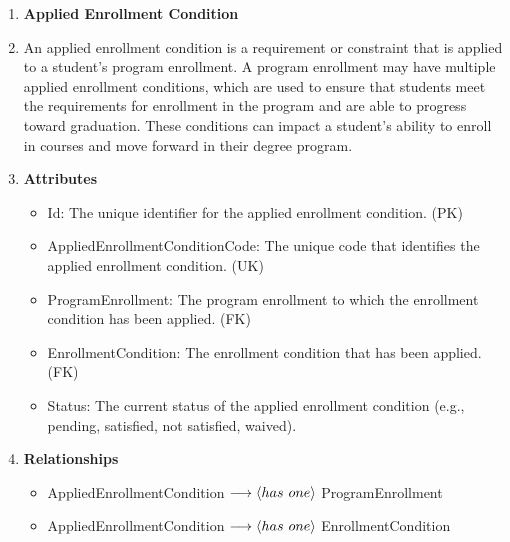 \documentclass[12pt]{article}
\begin{document}
\begin{appendices}
\begin{enumerate}[label=(\roman*)]
    \item \textbf{Applied Enrollment Condition}
    \item[] An applied enrollment condition is a requirement or constraint that is applied to a student's program enrollment. A program enrollment may have multiple applied enrollment conditions, which are used to ensure that students meet the requirements for enrollment in the program and are able to progress toward graduation. These conditions can impact a student's ability to enroll in courses and move forward in their degree program.
    \item[] \textbf{Attributes}
    \begin{itemize}
        \item Id: The unique identifier for the applied enrollment condition. (PK)
        \item AppliedEnrollmentConditionCode: The unique code that identifies the applied enrollment condition. (UK)
        \item ProgramEnrollment: The program enrollment to which the enrollment condition has been applied. (FK)
        \item EnrollmentCondition: The enrollment condition that has been applied. (FK)
        \item Status: The current status of the applied enrollment condition (e.g., pending, satisfied, not satisfied, waived).
    \end{itemize}
    \item[] \textbf{Relationships}
    \begin{itemize}
        \item AppliedEnrollmentCondition $ \longrightarrow \langle has \hspace{0.125cm} one \rangle $ ProgramEnrollment
        \item AppliedEnrollmentCondition $ \longrightarrow \langle has \hspace{0.125cm} one \rangle $ EnrollmentCondition
    \end{itemize}


\end{enumerate}
\end{appendices}
\end{document}
